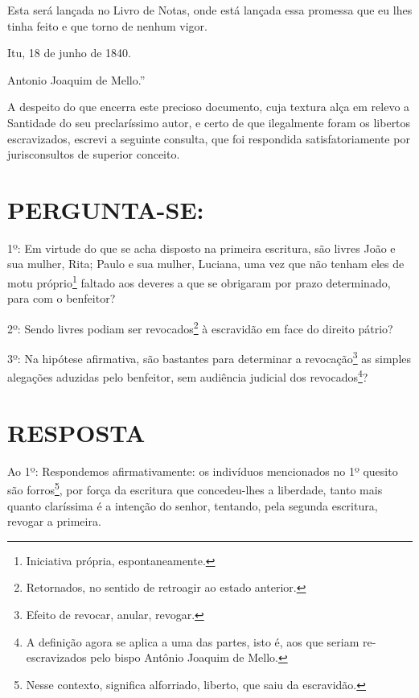 Esta será lançada no Livro de Notas, onde está lançada essa promessa que
eu lhes tinha feito e que torno de nenhum vigor.

Itu, 18 de junho de 1840.

Antonio Joaquim de Mello.''

A despeito do que encerra este precioso documento, cuja textura alça em
relevo a Santidade do seu preclaríssimo autor, e certo de que
ilegalmente foram os libertos escravizados, escrevi a seguinte consulta,
que foi respondida satisfatoriamente por jurisconsultos de superior
conceito.

\section{PERGUNTA-SE:}

1º: Em virtude do que se acha disposto na primeira escritura, são livres
João e sua mulher, Rita; Paulo e sua mulher, Luciana, uma vez que não
tenham eles de motu próprio\footnote{Iniciativa própria,
  espontaneamente.} faltado aos deveres a que se obrigaram por prazo
determinado, para com o benfeitor?

2º: Sendo livres podiam ser revocados\footnote{Retornados, no sentido
  de retroagir ao estado anterior.} à escravidão em face do direito
pátrio?

3º: Na hipótese afirmativa, são bastantes para determinar a
revocação\footnote{Efeito de revocar, anular, revogar.} as simples
alegações aduzidas pelo benfeitor, sem audiência judicial dos
revocados\footnote{A definição agora se aplica a uma das partes, isto
  é, aos que seriam re-escravizados pelo bispo Antônio Joaquim de Mello.}?

\section{RESPOSTA}

Ao 1º: Respondemos afirmativamente: os indivíduos mencionados no 1º
quesito são forros\footnote{Nesse contexto, significa alforriado,
  liberto, que saiu da escravidão.}, por força da escritura que
concedeu-lhes a liberdade, tanto mais quanto claríssima é a intenção do
senhor, tentando, pela segunda escritura, revogar a primeira.

